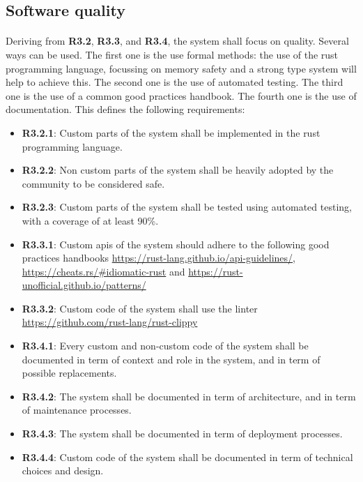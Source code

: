 \subsection{Software quality}

\paragraph{}
Deriving from \textbf{R3.2}, \textbf{R3.3}, and \textbf{R3.4}, the system shall focus on quality. Several ways can be used. The first one is the use formal methods: the use of the rust programming language, focussing on memory safety and a strong type system will help to achieve this. The second one is the use of automated testing. The third one is the use of a common good practices handbook. The fourth one is the use of documentation. This defines the following requirements:

\begin{itemize}
    \item \textbf{R3.2.1}: Custom parts of the system shall be implemented in the rust programming language.
    \item \textbf{R3.2.2}: Non custom parts of the system shall be heavily adopted by the community to be considered safe.
    \item \textbf{R3.2.3}: Custom parts of the system shall be tested using automated testing, with a coverage of at least 90\%.
    \item \textbf{R3.3.1}: Custom apis of the system should adhere to the following good practices handbooks \url{https://rust-lang.github.io/api-guidelines/}, \url{https://cheats.rs/#idiomatic-rust} and \url{https://rust-unofficial.github.io/patterns/}
    \item \textbf{R3.3.2}: Custom code of the system shall use the linter \url{https://github.com/rust-lang/rust-clippy}
    \item \textbf{R3.4.1}: Every custom and non-custom code of the system shall be documented in term of context and role in the system, and in term of possible replacements.
    \item \textbf{R3.4.2}: The system shall be documented in term of architecture, and in term of maintenance processes.
    \item \textbf{R3.4.3}: The system shall be documented in term of deployment processes.
    \item \textbf{R3.4.4}: Custom code of the system shall be documented in term of technical choices and design.
\end{itemize}
